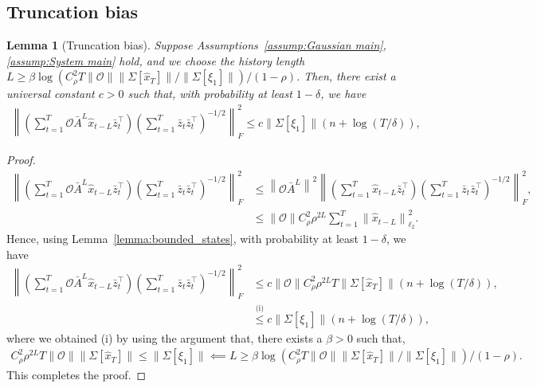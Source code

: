 \documentclass[11pt]{article}
\newtheorem{lemma}{Lemma}
\newcommand{\Abar}{\bar{A}}
\newcommand{\zbar}{\bar{z}}
\newcommand{\xtil}{\hat{x}}
\newcommand{\Ocal}{\mathcal{O}}
\newcommand{\tn}[1]{\left\|{#1}\right\|_{\ell_2}}
\newcommand{\nn}{\nonumber}
\newcommand{\tf}[1]{\left\|{#1}\right\|_{F}}
\newcommand{\leqsym}[1]{\stackrel{\text{(#1)}}{\leq}}
\newcommand{\norm}[1]{\|{#1} \|}
\newcommand{\normbig}[1]{\left\|{#1} \right\|}
\newcommand{\T}{\top}
\newcommand{\<}{\langle}
\renewcommand{\>}{\rangle}
\numberwithin{equation}{section}
\begin{document}
\subsection{Truncation bias}
\begin{lemma}[Truncation bias]\label{lemma:truncation_bias}
    Suppose Assumptions~\ref{assump:Gaussian main}, \ref{assump:System main} hold, and we choose the history length $ L \geq \beta\log\left(C_\rho^2 T \norm{\Ocal}\norm{\Sigma[\xtil_T]}/\norm{\Sigma[\xi_1]}\right)/(1-\rho)$. Then, there exist a universal constant $c>0$ such that, with probability at least $1-\delta$, we have
    \begin{align}
    \tf{\left(\sum_{t=1}^{T}  \Ocal \Abar^L \xtil_{t-L} \zbar_t^\T \right) \left(\sum_{t=1}^{T}  \zbar_t \zbar_t^\T \right)^{-1/2}}^2 \leq c \norm{\Sigma[\xi_1]}\left(n + \log (T/\delta)\right),
\end{align}
\end{lemma}
\begin{proof}
    \begin{align}
        \tf{\left(\sum_{t=1}^{T}  \Ocal \Abar^L \xtil_{t-L} \zbar_t^\T \right) \left(\sum_{t=1}^{T}  \zbar_t \zbar_t^\T \right)^{-1/2}}^2 & \leq \normbig{\Ocal \Abar^L}^2\tf{\left(\sum_{t=1}^{T}   \xtil_{t-L} \zbar_t^\T \right) \left(\sum_{t=1}^{T}  \zbar_t \zbar_t^\T \right)^{-1/2}}^2, \nn \\
        & \leq \norm{\Ocal} C_\rho^2 \rho^{2L} \sum_{t = 1}^T \tn{\xtil_{t-L}}^2.
    \end{align}
Hence, using Lemma~\ref{lemma:bounded_states}, with probability at least $1-\delta$, we have
\begin{align}
    \tf{\left(\sum_{t=1}^{T}  \Ocal \Abar^L \xtil_{t-L} \zbar_t^\T \right) \left(\sum_{t=1}^{T}  \zbar_t \zbar_t^\T \right)^{-1/2}}^2 & \leq c \norm{\Ocal} C_\rho^2 \rho^{2L} T \norm{\Sigma[\xtil_T]} \left(n + \log (T/\delta)\right), \nn\\
    &\leqsym{i} c \norm{\Sigma[\xi_1]} \left(n + \log (T/\delta)\right),
\end{align}
where we obtained (i) by using the argument that, there exists a $\beta>0$ such that,
\begin{align}
     C_\rho^2 \rho^{2L} T \norm{\Ocal}\norm{\Sigma[\xtil_T]} \leq \norm{\Sigma[\xi_1]} \impliedby L \geq \beta\log\left(C_\rho^2 T \norm{\Ocal}\norm{\Sigma[\xtil_T]}/\norm{\Sigma[\xi_1]}\right)/(1-\rho).
\end{align}
This completes the proof.
\end{proof}
\end{document}
